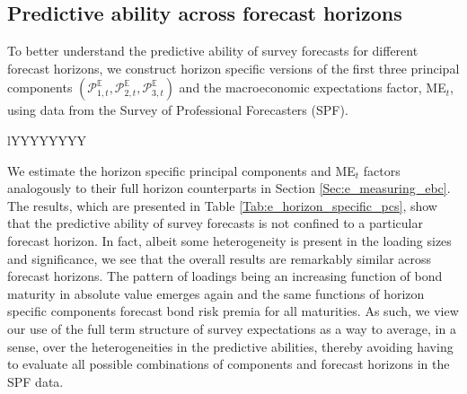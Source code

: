 \documentclass[12pt,a4paper,onecolumn,oneside,notitlepage]{article}
\begin{document}
\begin{appendices}
\section{Predictive ability across forecast horizons}\label{sec:predictive_ability_across_forecast_horizons}
To better understand the predictive ability of survey forecasts for different forecast horizons, we construct horizon specific versions of the first three principal components $\left(\mathcal{P}_{1,t}^{\mathbb{E}},\mathcal{P}_{2,t}^{\mathbb{E}},\mathcal{P}_{3,t}^{\mathbb{E}}\right)$ and the macroeconomic expectations factor, ME$_{t}$, using data from the Survey of Professional Forecasters (SPF).
\begin{table}[htbp]
    \footnotesize
    \caption{
        \textbf{Predictive ability across forecast horizons.} \newline
        This table reports slope estimates from regressing one-year ahead bond risk premia upon horizon specific versions of the first three principal components ($\mathcal{P}_{1,t}^{\mathbb{E}}$,$\mathcal{P}_{2,t}^{\mathbb{E}}$,$\mathcal{P}_{3,t}^{\mathbb{E}}$) of the Survey of Professional Forecasters (SPF) forecasts and expected business conditions $\left(\text{ME}_{t}\right)$. Although not reported, all regressions contain an intercept. \cite{HansenHodrick1980} t-statistics implemented with four lags are presented in parentheses. Adj. R$^{2}\left(\%\right)$ denotes the full sample adjusted coefficient of determination in percentage. The sample period starts in 1968:Q4 and ends in 2014:Q4.
    }
    \centering
    \begin{tabularx}{\textwidth}{lYYYYYYYY}
        \toprule
        
        \bottomrule
        \label{Tab:e_horizon_specific_pcs}
    \end{tabularx}
\end{table}
We estimate the horizon specific principal components and ME$_{t}$ factors analogously to their full horizon counterparts in Section \ref{Sec:e_measuring_ebc}. The results, which are presented in Table \ref{Tab:e_horizon_specific_pcs}, show that the predictive ability of survey forecasts is not confined to a particular forecast horizon. In fact, albeit some heterogeneity is present in the loading sizes and significance, we see that the overall results are remarkably similar across forecast horizons. The pattern of loadings being an increasing function of bond maturity in absolute value emerges again and the same functions of horizon specific components forecast bond risk premia for all maturities. As such, we view our use of the full term structure of survey expectations as a way to average, in a sense, over the heterogeneities in the predictive abilities, thereby avoiding having to evaluate all possible combinations of components and forecast horizons in the SPF data. 


\end{appendices}
\end{document}
